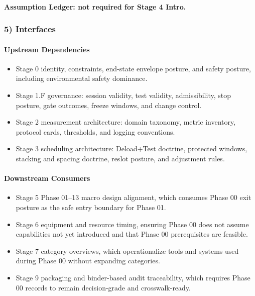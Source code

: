 \documentclass[10pt]{article}
\begin{document}
\paragraph*{Assumption Ledger: not required for Stage 4 Intro.}

\subsubsection*{5) Interfaces}

\paragraph*{Upstream Dependencies}

\begin{itemize}
\item Stage 0 identity, constraints, end-state envelope posture, and safety posture, including environmental safety dominance.
\item Stage 1.F governance: session validity, test validity, admissibility, stop posture, gate outcomes, freeze windows, and change control.
\item Stage 2 measurement architecture: domain taxonomy, metric inventory, protocol cards, thresholds, and logging conventions.
\item Stage 3 scheduling architecture: Deload+Test doctrine, protected windows, stacking and spacing doctrine, reslot posture, and adjustment rules.
\end{itemize}

\paragraph*{Downstream Consumers}

\begin{itemize}
\item Stage 5 Phase 01–13 macro design alignment, which consumes Phase 00 exit posture as the safe entry boundary for Phase 01.
\item Stage 6 equipment and resource timing, ensuring Phase 00 does not assume capabilities not yet introduced and that Phase 00 prerequisites are feasible.
\item Stage 7 category overviews, which operationalize tools and systems used during Phase 00 without expanding categories.
\item Stage 9 packaging and binder-based audit traceability, which requires Phase 00 records to remain decision-grade and crosswalk-ready.
\end{itemize}
\end{document}
